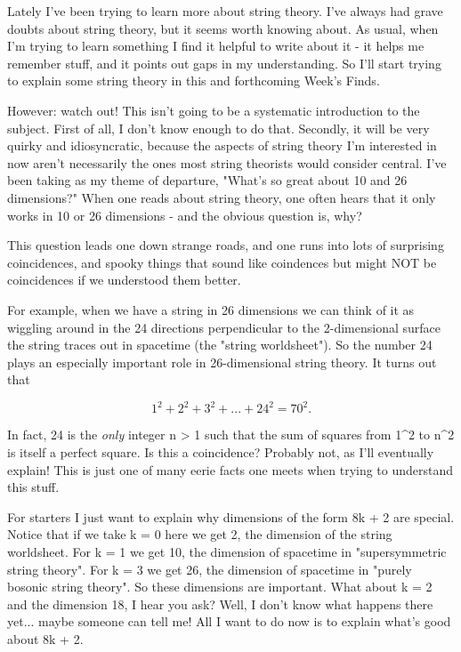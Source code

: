 




Lately I've been trying to learn more about string theory.  I've always
had grave doubts about string theory, but it seems worth knowing about.
As usual, when I'm trying to learn something I find it helpful to write
about it - it helps me remember stuff, and it points out gaps in my
understanding.  So I'll start trying to explain some string theory in
this and forthcoming Week's Finds.

However: watch out!  This isn't going to be a systematic introduction to
the subject.  First of all, I don't know enough to do that.  Secondly,
it will be very quirky and idiosyncratic, because the aspects of string
theory I'm interested in now aren't necessarily the ones most string
theorists would consider central.  I've been taking as my theme of
departure, "What's so great about 10 and 26 dimensions?"  When one
reads about string theory, one often hears that it only works in 10
or 26 dimensions - and the obvious question is, why?

This question leads one down strange roads, and one runs into lots of
surprising coincidences, and spooky things that sound like coindences
but might NOT be coincidences if we understood them better.   

For example, when we have a string in 26 dimensions we can think of it
as wiggling around in the 24 directions perpendicular to the
2-dimensional surface the string traces out in spacetime (the "string
worldsheet").  So the number 24 plays an especially important role in
26-dimensional string theory.  It turns out that


$$

  1^{2} + 2^{2} + 3^{2} + ... + 24^{2} = 70^{2}.  
$$
    
In fact, 24 is the \emph{only} integer n > 1 such that the sum of squares 
from 1^{2} to n^{2} is itself a perfect square.  Is this a 
coincidence?
Probably not, as I'll eventually explain!  This is just one of
many eerie facts one meets when trying to understand this stuff.


For starters I just want to explain why dimensions of the form 8k + 2
are special.  Notice that if we take k = 0 here we get 2, the dimension
of the string worldsheet.  For k = 1 we get 10, the dimension of
spacetime in "supersymmetric string theory".  For k = 3 we get
26, the dimension of spacetime in "purely bosonic string
theory".  So these dimensions are important.  What about k = 2 and
the dimension 18, I hear you ask?  Well, I don't know what happens there
yet... maybe someone can tell me!  All I want to do now is to explain
what's good about 8k + 2.

